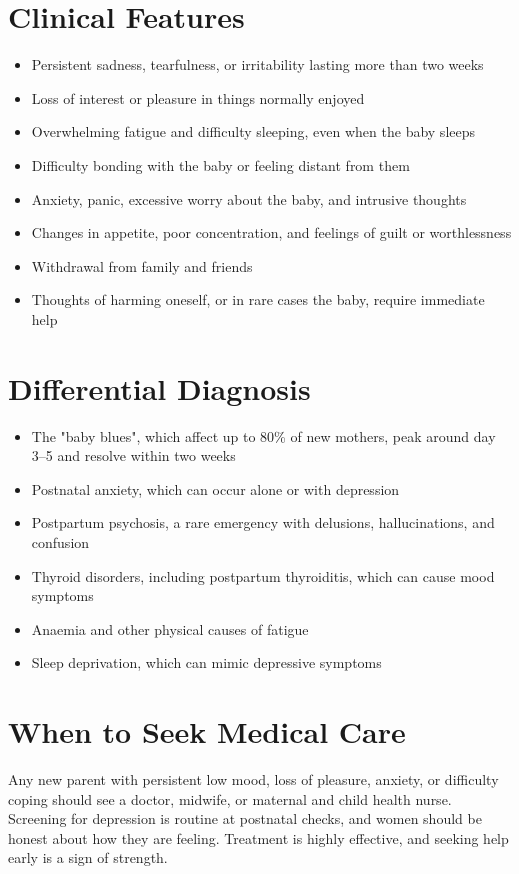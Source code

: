 \section*{Clinical Features}
\begin{itemize}
    \item Persistent sadness, tearfulness, or irritability lasting more than two weeks
    \item Loss of interest or pleasure in things normally enjoyed
    \item Overwhelming fatigue and difficulty sleeping, even when the baby sleeps
    \item Difficulty bonding with the baby or feeling distant from them
    \item Anxiety, panic, excessive worry about the baby, and intrusive thoughts
    \item Changes in appetite, poor concentration, and feelings of guilt or worthlessness
    \item Withdrawal from family and friends
    \item Thoughts of harming oneself, or in rare cases the baby, require immediate help
\end{itemize}

\section*{Differential Diagnosis}
\begin{itemize}
    \item The "baby blues", which affect up to 80\% of new mothers, peak around day 3--5 and resolve within two weeks
    \item Postnatal anxiety, which can occur alone or with depression
    \item Postpartum psychosis, a rare emergency with delusions, hallucinations, and confusion
    \item Thyroid disorders, including postpartum thyroiditis, which can cause mood symptoms
    \item Anaemia and other physical causes of fatigue
    \item Sleep deprivation, which can mimic depressive symptoms
\end{itemize}

\section*{When to Seek Medical Care}
Any new parent with persistent low mood, loss of pleasure, anxiety, or difficulty coping should see a doctor, midwife, or maternal and child health nurse. Screening for depression is routine at postnatal checks, and women should be honest about how they are feeling. Treatment is highly effective, and seeking help early is a sign of strength.

